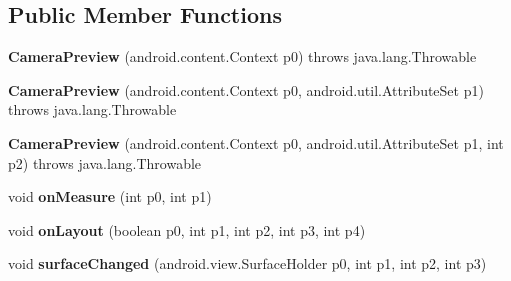 \subsection*{Public Member Functions}
\begin{DoxyCompactItemize}
\item 
\hypertarget{classmd5aba1581820273abb5f52cfbdde47dc28_1_1CameraPreview_ad95364c8753c24370b0cb54f7b5a15f0}{}{\bfseries Camera\+Preview} (android.\+content.\+Context p0)  throws java.\+lang.\+Throwable 	\label{classmd5aba1581820273abb5f52cfbdde47dc28_1_1CameraPreview_ad95364c8753c24370b0cb54f7b5a15f0}

\item 
\hypertarget{classmd5aba1581820273abb5f52cfbdde47dc28_1_1CameraPreview_adfd7753295be3df714a899fa4b700934}{}{\bfseries Camera\+Preview} (android.\+content.\+Context p0, android.\+util.\+Attribute\+Set p1)  throws java.\+lang.\+Throwable 	\label{classmd5aba1581820273abb5f52cfbdde47dc28_1_1CameraPreview_adfd7753295be3df714a899fa4b700934}

\item 
\hypertarget{classmd5aba1581820273abb5f52cfbdde47dc28_1_1CameraPreview_a282a31636ec5faa16b6ccd93d0e564d8}{}{\bfseries Camera\+Preview} (android.\+content.\+Context p0, android.\+util.\+Attribute\+Set p1, int p2)  throws java.\+lang.\+Throwable 	\label{classmd5aba1581820273abb5f52cfbdde47dc28_1_1CameraPreview_a282a31636ec5faa16b6ccd93d0e564d8}

\item 
\hypertarget{classmd5aba1581820273abb5f52cfbdde47dc28_1_1CameraPreview_a02ca99fd705ee06c954180360f36716a}{}void {\bfseries on\+Measure} (int p0, int p1)\label{classmd5aba1581820273abb5f52cfbdde47dc28_1_1CameraPreview_a02ca99fd705ee06c954180360f36716a}

\item 
\hypertarget{classmd5aba1581820273abb5f52cfbdde47dc28_1_1CameraPreview_afff144e89c49cbc8494055752932c32f}{}void {\bfseries on\+Layout} (boolean p0, int p1, int p2, int p3, int p4)\label{classmd5aba1581820273abb5f52cfbdde47dc28_1_1CameraPreview_afff144e89c49cbc8494055752932c32f}

\item 
\hypertarget{classmd5aba1581820273abb5f52cfbdde47dc28_1_1CameraPreview_a33b5f9ec58a05a63dee46f6d667f82a3}{}void {\bfseries surface\+Changed} (android.\+view.\+Surface\+Holder p0, int p1, int p2, int p3)\label{classmd5aba1581820273abb5f52cfbdde47dc28_1_1CameraPreview_a33b5f9ec58a05a63dee46f6d667f82a3}


\end{DoxyCompactItemize}
